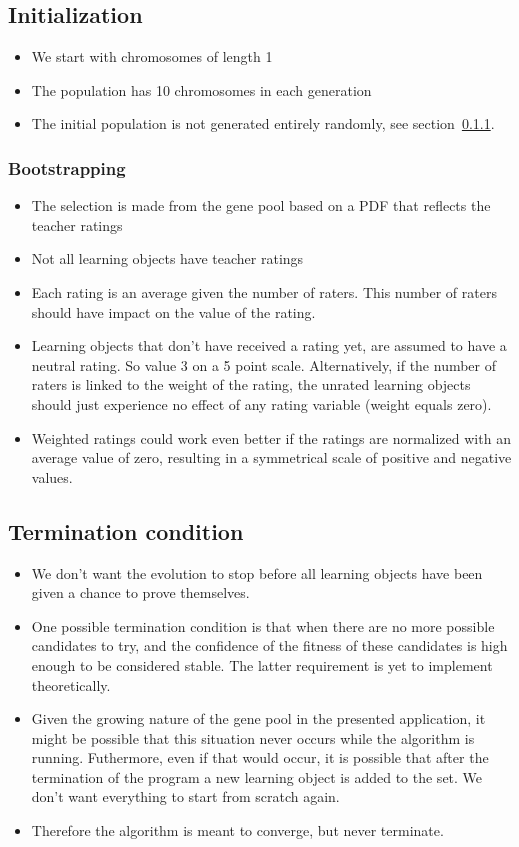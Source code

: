 \subsection{Initialization}
\begin{itemize}
	\item We start with chromosomes of length 1
	\item The population has 10 chromosomes in each generation
	\item The initial population is not generated entirely randomly, see
		section~\ref{sec:approach_bootstrapping}.
\end{itemize}
\subsubsection{Bootstrapping}
\label{sec:approach_bootstrapping}
\begin{itemize}
	\item The selection is made from the gene pool based on a PDF that reflects
		the teacher ratings
	\item Not all learning objects have teacher ratings
	\item Each rating is an average given the number of raters. This number of raters should have impact on the value of the rating.
	\item Learning objects that don't have received a rating yet, are assumed
		to have a neutral rating. So value 3 on a 5 point scale. Alternatively, if the number of raters is linked to the weight of the rating, the unrated learning objects should just experience no effect of any rating variable (weight equals zero).
	\item Weighted ratings could work even better if the ratings are normalized with an average value of zero, resulting in a symmetrical scale of positive and negative values.
\end{itemize}
\subsection{Termination condition}
\begin{itemize}
	\item We don't want the evolution to stop before all learning objects have
		been given a chance to prove themselves.
	\item One possible termination condition is that when there are no more
		possible candidates to try, and the confidence of the fitness of these
		candidates is high enough to be considered stable. The latter
		requirement is yet to implement theoretically.
	\item Given the growing nature of the gene pool in the presented
		application, it might be possible that this situation never occurs
		while the algorithm is running. Futhermore,	even if that would occur,
		it is possible that after the termination of the program a new learning
		object is added to the set. We don't want everything to start from
		scratch again.
	\item Therefore the algorithm is meant to converge, but never terminate.
\end{itemize}
